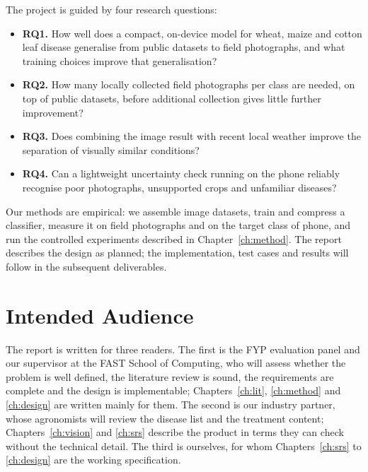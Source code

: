 The project is guided by four research questions:
\begin{itemize}
  \item \textbf{RQ1.} How well does a compact, on-device model for wheat, maize and cotton leaf disease generalise from public datasets to field photographs, and what training choices improve that generalisation?
  \item \textbf{RQ2.} How many locally collected field photographs per class are needed, on top of public datasets, before additional collection gives little further improvement?
  \item \textbf{RQ3.} Does combining the image result with recent local weather improve the separation of visually similar conditions?
  \item \textbf{RQ4.} Can a lightweight uncertainty check running on the phone reliably recognise poor photographs, unsupported crops and unfamiliar diseases?
\end{itemize}

Our methods are empirical: we assemble image datasets, train and compress a classifier, measure it on field photographs and on the target class of phone, and run the controlled experiments described in Chapter~\ref{ch:method}. The report describes the design as planned; the implementation, test cases and results will follow in the subsequent deliverables.

\section{Intended Audience}
The report is written for three readers. The first is the FYP evaluation panel and our supervisor at the FAST School of Computing, who will assess whether the problem is well defined, the literature review is sound, the requirements are complete and the design is implementable; Chapters~\ref{ch:lit}, \ref{ch:method} and \ref{ch:design} are written mainly for them. The second is our industry partner, whose agronomists will review the disease list and the treatment content; Chapters~\ref{ch:vision} and \ref{ch:srs} describe the product in terms they can check without the technical detail. The third is ourselves, for whom Chapters~\ref{ch:srs} to \ref{ch:design} are the working specification.

